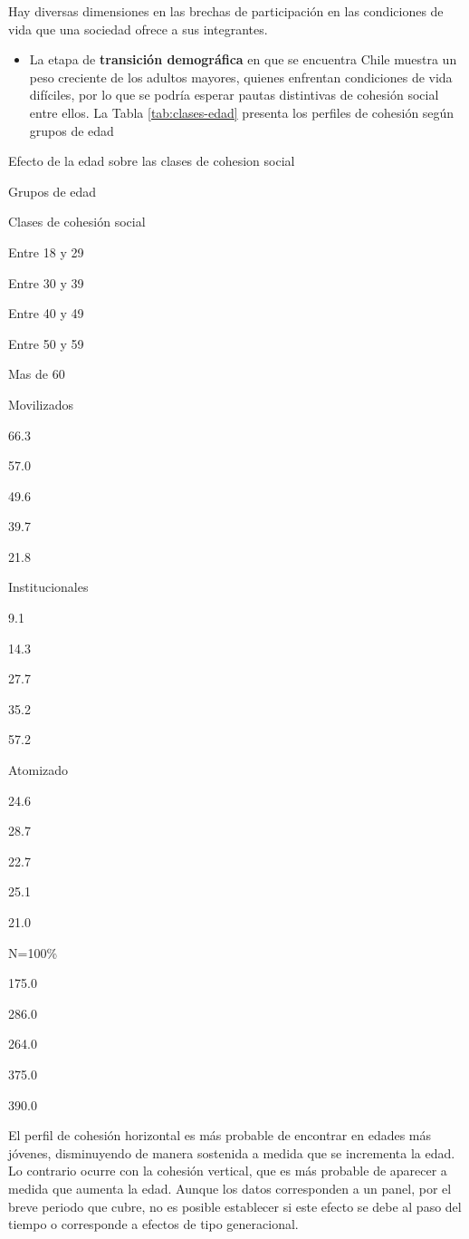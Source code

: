 \documentclass[
  12pt,
]{book}
\providecommand{\tightlist}{%
  \setlength{\itemsep}{0pt}\setlength{\parskip}{0pt}}
\begin{document}
Hay diversas dimensiones en las brechas de participación en las condiciones de vida que una sociedad ofrece a sus integrantes.

\begin{itemize}
\tightlist
\item
  La etapa de \textbf{transición demográfica} en que se encuentra Chile muestra un peso creciente de los adultos mayores, quienes enfrentan condiciones de vida difíciles, por lo que se podría esperar pautas distintivas de cohesión social entre ellos. La Tabla \ref{tab:clases-edad} presenta los perfiles de cohesión según grupos de edad
\end{itemize}

\label{tab:clases-edad}Efecto de la edad sobre las clases de cohesion social

Grupos de edad

Clases de cohesión social

Entre 18 y 29

Entre 30 y 39

Entre 40 y 49

Entre 50 y 59

Mas de 60

Movilizados

66.3

57.0

49.6

39.7

21.8

Institucionales

9.1

14.3

27.7

35.2

57.2

Atomizado

24.6

28.7

22.7

25.1

21.0

N=100\%

175.0

286.0

264.0

375.0

390.0

El perfil de cohesión horizontal es más probable de encontrar en edades más jóvenes, disminuyendo de manera sostenida a medida que se incrementa la edad. Lo contrario ocurre con la cohesión vertical, que es más probable de aparecer a medida que aumenta la edad. Aunque los datos corresponden a un panel, por el breve periodo que cubre, no es posible establecer si este efecto se debe al paso del tiempo o corresponde a efectos de tipo generacional.
\end{document}

